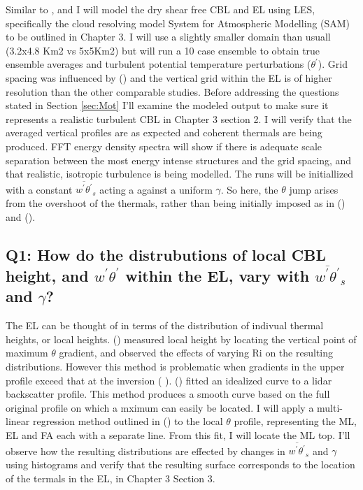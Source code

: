 Similar to \citeauthor{SullMoengStev} \citeyear{SullMoengStev}, \citeauthor{FedConzMir04} \citeyear{FedConzMir04} and \citeauthor{BrooksFowler2} \citeyear{BrooksFowler2} I will model the dry shear free \acs{CBL} and \acs{EL} using \acs{LES}, specifically the cloud resolving model System for Atmospheric Modelling (SAM) to be outlined in Chapter 3.  I will use a slightly smaller domain than usuall (3.2x4.8 Km2 vs 5x5Km2) but will run a 10 case ensemble to obtain true ensemble averages and turbulent potential temperature perturbations ($\theta^{'}$). Grid spacing was influenced by \citeauthor{SullPat} (\citeyear{SullPat}) and the vertical grid within the \acs{EL} is of higher resolution than the other comparable studies. Before addressing the questions stated in Section \ref{sec:Mot} I'll examine the modeled output to make sure it represents a realistic turbulent \acs{CBL} in Chapter 3 section 2. I will verify that the averaged vertical profiles are as expected and coherent thermals are being produced.  FFT energy density spectra will show if there is adequate scale separation between the most energy intense structures and the grid spacing, and that realistic, isotropic turbulence is being modelled.  The runs will be initiallized with a constant $\overline{w^{'}\theta^{'}}_{s}$ acting a against a uniform $\gamma$.  So here, the  $\theta$ jump arises from the overshoot of the thermals, rather than being initially imposed as in \citeauthor{SullMoengStev} (\citeyear{SullMoengStev}) and \citeauthor{BrooksFowler2} (\citeyear{BrooksFowler2}).  

\subsection{Q1: How do the distrubutions of local \acs{CBL} height, and $w^{'}\theta^{'}$ within the \acs{EL}, vary with $\overline{w^{'}\theta^{'}}_{s}$ and $\gamma$?}     

The \acs{EL} can be thought of in terms of the distribution of indivual thermal heights, or local heights. \citeauthor{SullMoengStev} (\citeyear{SullMoengStev}) measured local height by locating the vertical point of maximum $\theta$ gradient, and observed the effects of varying \acs{Ri} on the resulting distributions. However this method is problematic when gradients in the upper profile exceed that at the inversion (\citeauthor{BrooksFowler2} \citeyear{BrooksFowler2}).  \citeauthor{SteynBaldHoff} (\citeyear{SteynBaldHoff}) fitted an idealized curve to a lidar backscatter profile.  This method produces a smooth curve based on the full original profile on which a mximum can easily be located.  I will apply a multi-linear regression method outlined in \citeauthor{Vieth} (\citeyear{Vieth}) to the local $\theta$ profile, representing the \acs{ML}, \acs{EL} and \acs{FA} each with a separate line. From this fit, I will locate the \acs{ML} top.  I'll observe how the resulting distributions are effected by changes in $\overline{w^{'}\theta^{'}}_{s}$ and $\gamma$ using histograms and verify that the resulting surface corresponds to the location of the termals in the \acs{EL}, in Chapter 3 Section 3.\\

